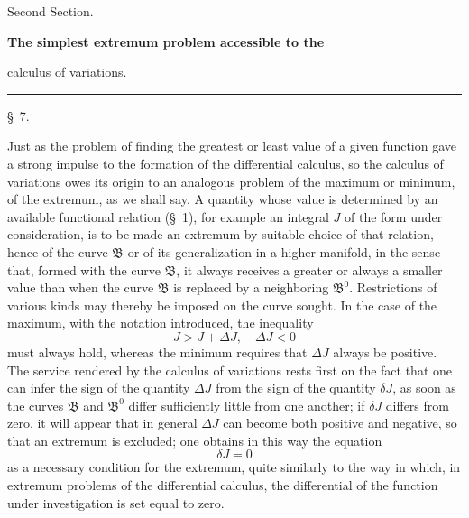 \documentclass[11pt,a4paper,leqno]{article}
\begin{document}
\begin{center}
{\large Second Section.}\par
\vspace{4mm}
{\Large\bfseries The simplest extremum problem accessible to the\par calculus of variations.}\par
\vspace{2mm}\rule{26mm}{0.4pt}\par
\end{center}

\begin{center}{\large \S~7.}\end{center}

Just as the problem of finding the greatest or least value of a given function gave a strong impulse to the formation of the differential calculus, so the calculus of variations owes its origin to an analogous problem of the maximum or minimum, of the extremum, as we shall say. A quantity whose value is determined by an available functional relation (\S~1), for example an integral $J$ of the form under consideration, is to be made an extremum by suitable choice of that relation, hence of the curve $\mathfrak{B}$ or of its generalization in a higher manifold, in the sense that, formed with the curve $\mathfrak{B}$, it always receives a greater or always a smaller value than when the curve $\mathfrak{B}$ is replaced by a neighboring $\mathfrak{B}^0$. Restrictions of various kinds may thereby be imposed on the curve sought. In the case of the maximum, with the notation introduced, the inequality
\[
J>J+\Delta J,\quad \Delta J<0
\]
must always hold, whereas the minimum requires that $\Delta J$ always be positive. The service rendered by the calculus of variations rests first on the fact that one can infer the sign of the quantity $\Delta J$ from the sign of the quantity $\delta J$, as soon as the curves $\mathfrak{B}$ and $\mathfrak{B}^0$ differ sufficiently little from one another; if $\delta J$ differs from zero, it will appear that in general $\Delta J$ can become both positive and negative, so that an extremum is excluded; one obtains in this way the equation
\[
\delta J=0
\]
as a necessary condition for the extremum, quite similarly to the way in which, in extremum problems of the differential calculus, the differential of the function under investigation is set equal to zero.
\end{document}
